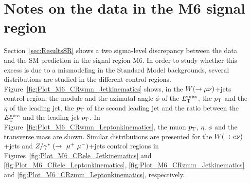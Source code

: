 \chapter{Notes on the data in the M6 signal region}
    \label{app:scaleFactorEvolution}

Section~\ref{sec:ResultsSR} shows a two sigma-level discrepancy between the data and the SM prediction in the signal region M6.
In order to study whether this excess is due to a mismodeling in the Standard Model backgrounds, several distributions are studied in the different control regions.
Figure~\ref{fig:Plot_M6_CRwmn_Jetkinematics} shows, in the $W(\rightarrow \mu \nu)$+jets control region, the module and the azimutal angle $\phi$ of the $E_{\mathrm{T}}^{\mathrm{miss}}$, the $p_{\mathrm{T}}$ and the $\eta$ of the leading jet, the $p_{\mathrm{T}}$ of the second leading jet and the ratio between the $E_{\mathrm{T}}^{\mathrm{miss}}$ and the leading jet $p_{\mathrm{T}}$.
In Figure~\ref{fig:Plot_M6_CRwmn_Leptonkinematics}, the muon $p_{\mathrm{T}}$, $\eta$, $\phi$ and the transverse mass are shown.
Similar distributions are presented for the $W(\rightarrow e \nu)$+jets and $Z/\gamma^*~(\rightarrow~\mu^+~\mu^-)$+jets control regions in Figures~\ref{fig:Plot_M6_CRele_Jetkinematics} and \ref{fig:Plot_M6_CRele_Leptonkinematics}, \ref{fig:Plot_M6_CRzmm_Jetkinematics} and \ref{fig:Plot_M6_CRzmm_Leptonkinematics}, respectively.

